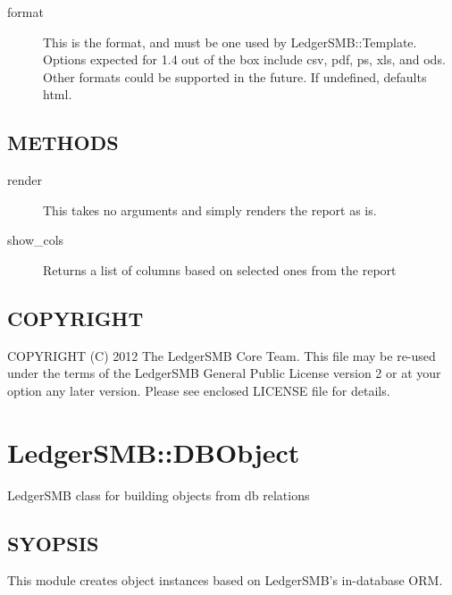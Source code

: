 \begin{description}
\begin{description}
\begin{description}
\begin{description}
\begin{description}
\begin{description}
\item[{format}] \mbox{}

This is the format, and must be one used by LedgerSMB::Template.  Options
expected for 1.4 out of the box include csv, pdf, ps, xls, and ods.  Other
formats could be supported in the future.  If undefined, defaults html.

\end{description}
\subsection*{METHODS\label{LedgerSMB::DBObject::Report_METHODS}}
\begin{description}

\item[{render}] \mbox{}

This takes no arguments and simply renders the report as is.


\item[{show\_cols}] \mbox{}

Returns a list of columns based on selected ones from the report

\end{description}
\subsection*{COPYRIGHT\label{LedgerSMB::DBObject::Report_COPYRIGHT}}


COPYRIGHT (C) 2012 The LedgerSMB Core Team.  This file may be re-used under the
terms of the LedgerSMB General Public License version 2 or at your option any
later version.  Please see enclosed LICENSE file for details.

\section{LedgerSMB::DBObject\label{LedgerSMB::DBObject}}


LedgerSMB class for building objects from db relations

\subsection*{SYOPSIS\label{LedgerSMB::DBObject_SYOPSIS}}


This module creates object instances based on LedgerSMB's in-database ORM.


\end{description}
\end{description}
\end{description}
\end{description}
\end{description}
